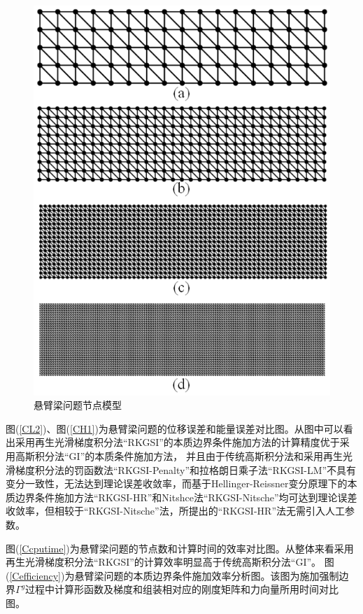 \newpage
\begin{figure}[H]
    \centering
    \includegraphics[scale=0.7]{figure/EHR/cantilever/cantilever.mesh.png}
    \caption{悬臂梁问题节点模型}\label{cantilever.mesh}
\end{figure}
图(\ref{CL2})、图(\ref{CH1})为悬臂梁问题的位移误差和能量误差对比图。从图中可以看出采用再生光滑梯度积分法“RKGSI”的本质边界条件施加方法的计算精度优于采用高斯积分法“GI”的本质条件施加方法，
并且由于传统高斯积分法和采用再生光滑梯度积分法的罚函数法“RKGSI-Penalty”和拉格朗日乘子法“RKGSI-LM”不具有变分一致性，无法达到理论误差收敛率，而基于Hellinger-Reissner变分原理下的本质边界条件施加方法“RKGSI-HR”和Nitshce法“RKGSI-Nitsche”均可达到理论误差收敛率，但相较于“RKGSI-Nitsche”法，所提出的“RKGSI-HR”法无需引入人工参数。\par
图(\ref{Ccputime})为悬臂梁问题的节点数和计算时间的效率对比图。从整体来看采用再生光滑梯度积分法“RKGSI”的计算效率明显高于传统高斯积分法“GI”。
图(\ref{Cefficiency})为悬臂梁问题的本质边界条件施加效率分析图。该图为施加强制边界$\Gamma^g$过程中计算形函数及梯度和组装相对应的刚度矩阵和力向量所用时间对比图。
